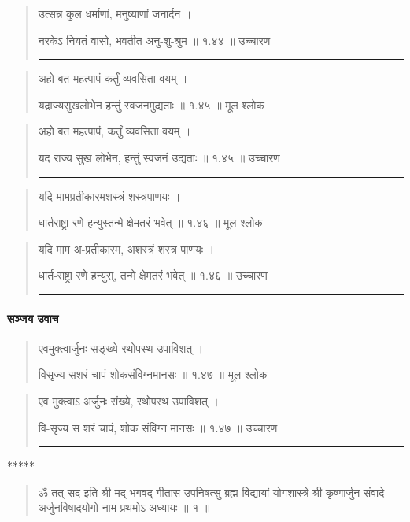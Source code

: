 \begin{quotation}

उत्सन्न कुल धर्माणां, मनुष्याणां जनार्दन  ।  


नरकेऽ नियतं वासो, भवतीत अनु-शु-श्रुम  ॥ १.४४ ॥  उच्चारण

\noindent\rule{16cm}{0.4pt} 
\end{quotation}


\begin{quotation} 
अहो बत महत्पापं कर्तुं व्यवसिता वयम्‌  ।  


यद्राज्यसुखलोभेन हन्तुं स्वजनमुद्यताः  ॥ १.४५ ॥  मूल श्लोक
\end{quotation}

\begin{quotation}

अहो बत महत्पापं, कर्तुं व्यवसिता वयम्  ।  


यद राज्य सुख लोभेन, हन्तुं स्वजनं उद्यताः  ॥ १.४५ ॥  उच्चारण

\noindent\rule{16cm}{0.4pt} 
\end{quotation}


\begin{quotation} 

यदि मामप्रतीकारमशस्त्रं शस्त्रपाणयः  ।  


धार्तराष्ट्रा रणे हन्युस्तन्मे क्षेमतरं भवेत्‌  ॥ १.४६ ॥  मूल श्लोक
\end{quotation}

\begin{quotation}

यदि माम अ-प्रतीकारम, अशस्त्रं शस्त्र पाणयः  ।  


धार्त-राष्ट्रा रणे हन्युस्, तन्मे क्षेमतरं भवेत्  ॥ १.४६ ॥  उच्चारण

\noindent\rule{16cm}{0.4pt} 
\end{quotation}

\paragraph{\sanskrit सञ्जय उवाच}

\begin{quotation} 


एवमुक्त्वार्जुनः सङ्‍ख्ये रथोपस्थ उपाविशत्‌  ।  


विसृज्य सशरं चापं शोकसंविग्नमानसः  ॥ १.४७ ॥  मूल श्लोक
\end{quotation}

\begin{quotation}

एव मुक्त्वाऽ अर्जुनः संख्ये, रथोपस्थ उपाविशत्  ।  


वि-सृज्य स शरं चापं, शोक संविग्न मानसः  ॥ १.४७ ॥  उच्चारण

\noindent\rule{16cm}{0.4pt} 
\end{quotation}


\begin{center} ***** \end{center}
\begin{quotation}
ॐ तत् सद इति श्री मद्-भगवद्-गीतास उपनिषत्सु ब्रह्म विद्यायां योगशास्त्रे श्री कृष्णार्जुन संवादे अर्जुनविषादयोगो नाम प्रथमोऽ अध्यायः  ॥  १ ॥ 
\end{quotation}